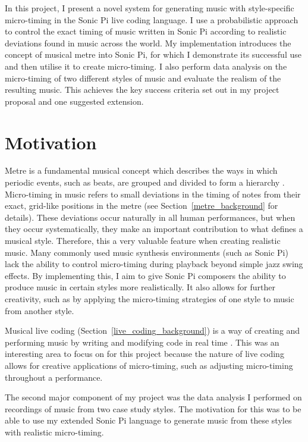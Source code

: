 \documentclass[12pt,twoside,openright]{report}
\begin{document}
In this project, I present a novel system for generating music with
style-specific micro-timing in the Sonic Pi live coding language. I
use a probabilistic approach to control the exact timing of music written in
Sonic Pi according to realistic deviations found in music across the world. My
implementation introduces the concept of musical metre into Sonic Pi, for which
I demonstrate its successful use and then utilise it to create micro-timing. I also
perform data analysis on the micro-timing of two different styles of music and
evaluate the realism of the resulting music. This achieves the key success
criteria set out in my project proposal and one suggested extension.



\section{Motivation} \label{motivation}

Metre is a fundamental musical concept which describes the ways in which periodic events, such as beats, are grouped and divided to form a hierarchy \cite{london2012}. Micro-timing in music refers to small deviations in the timing of notes from
their exact, grid-like positions in the metre (see Section~\ref{metre_background} for details). These
deviations occur naturally in all human performances, but when they occur
systematically, they make an important contribution to what defines a musical
style. Therefore, this a very valuable feature when creating realistic music.
Many commonly used music synthesis environments (such as Sonic Pi) lack the
ability to control micro-timing during playback beyond simple jazz swing effects.
By implementing this, I aim to give Sonic Pi composers the ability to produce
music in certain styles more realistically. It also allows for further
creativity, such as by applying the micro-timing strategies of one style to
music from another style.

Musical live coding (Section~\ref{live_coding_background}) is a way of creating and performing music by writing
and modifying code in real time \cite{magnusson2011}. This was an interesting area to focus on for
this project because the nature of live coding allows for creative applications
of micro-timing, such as adjusting micro-timing throughout a performance.

The second major component of my project was the data analysis I performed
on recordings of music from two case study styles. The motivation for this was
to be able to use my extended Sonic Pi language to generate music from these styles with
realistic micro-timing.
\end{document}
